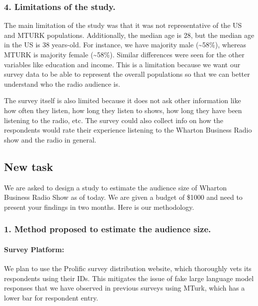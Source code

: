 \documentclass[
]{article}
\begin{document}
\hypertarget{limitations-of-the-study.}{%
\subsubsection{4. Limitations of the
study.}\label{limitations-of-the-study.}}

The main limitation of the study was that it was not representative of
the US and MTURK populations. Additionally, the median age is 28, but
the median age in the US is 38 years-old. For instance, we have majority
male (\textasciitilde58\%), whereas MTURK is majority female
(\textasciitilde58\%). Similar differences were seen for the other
variables like education and income. This is a limitation because we
want our survey data to be able to represent the overall populations so
that we can better understand who the radio audience is.

The survey itself is also limited because it does not ask other
information like how often they listen, how long they listen to shows,
how long they have been listening to the radio, etc. The survey could
also collect info on how the respondents would rate their experience
listening to the Wharton Business Radio show and the radio in general.

\hypertarget{new-task}{%
\subsection{New task}\label{new-task}}

We are asked to design a study to estimate the audience size of Wharton
Business Radio Show as of today. We are given a budget of \$1000 and
need to present your findings in two months. Here is our methodology.

\hypertarget{method-proposed-to-estimate-the-audience-size.}{%
\subsubsection{1. Method proposed to estimate the audience
size.}\label{method-proposed-to-estimate-the-audience-size.}}

\hypertarget{survey-platform}{%
\paragraph{Survey Platform:}\label{survey-platform}}

We plan to use the Prolific survey distribution website, which
thoroughly vets its respondents using their IDs. This mitigates the
issue of fake large language model responses that we have observed in
previous surveys using MTurk, which has a lower bar for respondent
entry.
\end{document}
